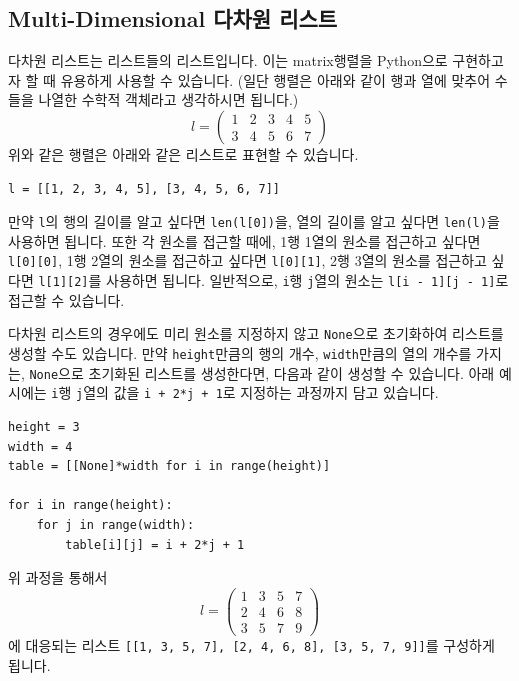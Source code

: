 \documentclass[../main.tex]{subfiles}
\begin{document}
\subsection{Multi-Dimensional 다차원 리스트}
다차원 리스트는 리스트들의 리스트입니다.
이는 matrix행렬을 Python으로 구현하고자 할 때 유용하게 사용할 수 있습니다.
(일단 행렬은 아래와 같이 행과 열에 맞추어 수들을 나열한 수학적 객체라고 생각하시면 됩니다.)
\[
l =
  \begin{pmatrix}
    1 & 2 & 3 & 4 & 5 \\
    3 & 4 & 5 & 6 & 7
  \end{pmatrix}
\]
위와 같은 행렬은 아래와 같은 리스트로 표현할 수 있습니다.
\begin{verbatim}
l = [[1, 2, 3, 4, 5], [3, 4, 5, 6, 7]]
\end{verbatim}
만약 \texttt{l}의 행의 길이를 알고 싶다면 \texttt{len(l[0])}을, 열의 길이를 알고 싶다면 \texttt{len(l)}을 사용하면 됩니다.
또한 각 원소를 접근할 때에, 1행 1열의 원소를 접근하고 싶다면 \texttt{l[0][0]}, 1행 2열의 원소를 접근하고 싶다면 \texttt{l[0][1]}, 2행 3열의 원소를 접근하고 싶다면 \texttt{l[1][2]}를 사용하면 됩니다.
일반적으로, \texttt{i}행 \texttt{j}열의 원소는 \texttt{l[i - 1][j - 1]}로 접근할 수 있습니다.

다차원 리스트의 경우에도 미리 원소를 지정하지 않고 \texttt{None}으로 초기화하여 리스트를 생성할 수도 있습니다.
만약 \texttt{height}만큼의 행의 개수, \texttt{width}만큼의 열의 개수를 가지는, \texttt{None}으로 초기화된 리스트를 생성한다면, 다음과 같이 생성할 수 있습니다.
아래 예시에는 \texttt{i}행 \texttt{j}열의 값을 \texttt{i + 2*j + 1}로 지정하는 과정까지 담고 있습니다.
\begin{verbatim}
height = 3
width = 4
table = [[None]*width for i in range(height)]

for i in range(height):
    for j in range(width):
        table[i][j] = i + 2*j + 1
\end{verbatim}
위 과정을 통해서 
\[
l =
  \begin{pmatrix}
    1 & 3 & 5 & 7\\
    2 & 4 & 6 & 8\\
    3 & 5 & 7 & 9
  \end{pmatrix}
\]
에 대응되는 리스트 \texttt{[[1, 3, 5, 7], [2, 4, 6, 8], [3, 5, 7, 9]]}를 구성하게 됩니다.
\end{document}
